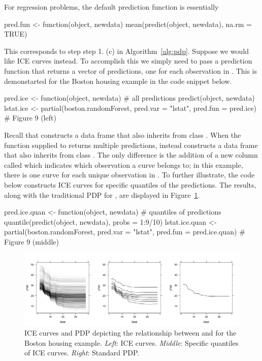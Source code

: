 \newpage

For regression problems, the default prediction function is essentially
\begin{example}
pred.fun <- function(object, newdata) {
  mean(predict(object, newdata), na.rm = TRUE)
}
\end{example}
This corresponds to step step 1. (c) in Algorithm~\ref{alg:pdp}. Suppose we would like ICE curves instead. To accomplish this we simply need to pass a prediction function that returns a vector of predictions, one for each observation in . This is demonstarted for the Boston housing example in the code snippet below.
\begin{example}
pred.ice <- function(object, newdata) {  # all predictions
  predict(object, newdata)
}
lstat.ice <- partial(boston.randomForest, pred.var = "lstat",
                     pred.fun = pred.ice)  # Figure 9 (left)
\end{example}

Recall that  constructs a data frame that also inherits from class . When the function supplied to  returns multiple predictions,  instead constructs a data frame that also inherits from class . The only difference is the addition of a new column called  which indicates which observation a curve belongs to; in this example, there is one curve for each unique observation in . To further illustrate, the code below constructs ICE curves for specific quantiles of the predictions. The results, along with the traditional PDP for , are displayed in Figure~\ref{fig:partial_boston_ice}.
\begin{example}
pred.ice.quan <- function(object, newdata) {  # quantiles of predictions
  quantile(predict(object, newdata), probs = 1:9/10)
}
lstat.ice.quan <- partial(boston.randomForest, pred.var = "lstat",
                          pred.fun = pred.ice.quan)  # Figure 9 (middle)
\end{example}

\begin{figure}[!htbp]
  \centering
  \includegraphics[width=1.0\linewidth]{partial_boston_ice}
  \caption{ICE curves and PDP depicting the relationship between  and  for the Boston housing example. \textit{Left}: ICE curves. \textit{Middle}: Specific quantiles of ICE curves. \textit{Right}: Standard PDP.}
  \label{fig:partial_boston_ice}
\end{figure}


